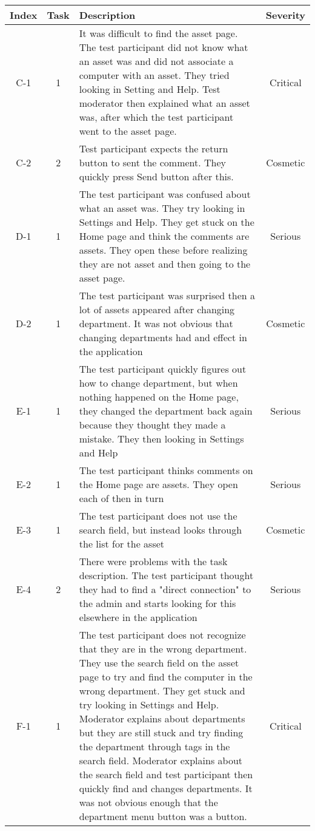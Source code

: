 \begin{longtable}{| c | c | p{8cm} | c |}
        \hline
        \textbf{Index} & \textbf{Task} & \textbf{Description} & \textbf{Severity}
        \\
        \hline
        C-1 & 1 & It was difficult to find the asset page. The test participant did not know what an asset was and did not associate a computer with an asset. They tried looking in Setting and Help. Test moderator then explained what an asset was, after which the test participant went to the asset page. & Critical
        \\
        \hline
        C-2 & 2 & Test participant expects the return button to sent the comment. They quickly press Send button after this. & Cosmetic
        \\
        \hline
        D-1 & 1 & The test participant was confused about what an asset was. They try looking in Settings and Help. They get stuck on the Home page and think the comments are assets. They open these before realizing they are not asset and then going to the asset page. & Serious
        \\
        \hline
        D-2 & 1 & The test participant was surprised then a lot of assets appeared after changing department. It was not obvious that changing departments had and effect in the application & Cosmetic
        \\
        \hline
        E-1 & 1 & The test participant quickly figures out how to change department, but when nothing happened on the Home page, they changed the department back again because they thought they made a mistake. They then looking in Settings and Help & Serious
        \\
        \hline
        E-2 & 1 & The test participant thinks comments on the Home page are assets. They open each of then in turn & Serious
        \\
        \hline
        E-3 & 1 & The test participant does not use the search field, but instead looks through the list for the asset &  Cosmetic
        \\
        \hline
        E-4 & 2 & There were problems with the task description. The test participant thought they had to find a "direct connection" to the admin and starts looking for this elsewhere in the application & Serious
        \\
        \hline
        F-1 & 1 & The test participant does not recognize that they are in the wrong department. They use the search field on the asset page to try and find the computer in the wrong department. They get stuck and try looking in Settings and Help. Moderator explains about departments but they are still stuck and try finding the department through tags in the search field. Moderator explains about the search field and test participant then quickly find and changes departments. It was not obvious enough that the department menu button was a button. & Critical

\end{longtable}

